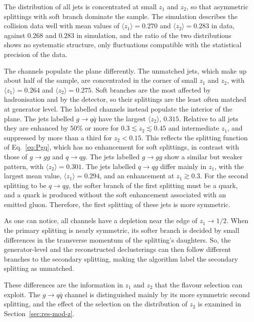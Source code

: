The distribution of all jets is concentrated at small $z_1$ and $z_2$, so that asymmetric splittings
with soft branch dominate the sample. The simulation describes the collision data well
with mean values of $\langle z_1 \rangle = 0.270$ and $\langle z_2 \rangle = 0.283$ in data, against
$0.268$ and $0.283$ in simulation, and the ratio of the two distributions shows no
systematic structure, only fluctuations compatible with the statistical
precision of the data.

The channels populate the plane differently. The unmatched jets, which make up
about half of the sample, are concentrated in the corner of small $z_1$ and $z_2$,
with $\langle z_1 \rangle = 0.264$ and $\langle z_2 \rangle = 0.275$. Soft branches
are the most affected by hadronisation and by the detector, so their splittings
are the least often matched at generator level. The labelled channels instead
populate the interior of the plane. The jets labelled $g \to q\bar{q}$ have the
largest $\langle z_2 \rangle$, $0.315$. Relative to all jets they are enhanced by
$50\%$ or more for $0.3 \lesssim z_2 \lesssim 0.45$ and intermediate $z_1$, and
suppressed by more than a third for $z_2 < 0.15$. This reflects the splitting
function of Eq.~\eqref{eq:Pgq}, which has no enhancement for soft splittings,
in contrast with those of $g \to gg$ and $q \to qg$. The jets labelled $g \to gg$
show a similar but weaker pattern, with $\langle z_2 \rangle = 0.301$. The jets
labelled $q \to qg$ differ mainly in $z_1$, with the largest mean value,
$\langle z_1 \rangle = 0.294$, and an enhancement at $z_1 \gtrsim 0.3$.
For the second splitting to be $q \to qg$, the softer branch of the first splitting must
be a quark, and a quark is produced without the soft enhancement associated with
an emitted gluon. Therefore, the first splitting of these jets is more symmetric.

As one can notice, all channels have a depletion near the edge of $z_1 \to 1/2$.
When the primary splitting is nearly symmetric, its softer branch is decided by small
differences in the transverse momentum of the splitting's daughters. So, 
the generator-level and the reconstructed declusterings can then follow different
branches to the secondary splitting, making the algorithm label the secondary 
splitting as unmatched.

These differences are the information in $z_1$ and $z_2$ that the flavour
selection can exploit. The $g \to q\bar{q}$ channel is distinguished mainly by
its more symmetric second splitting, and the effect of the selection on the
distribution of $z_2$ is examined in Section~\ref{sec:res-mod-z}.

